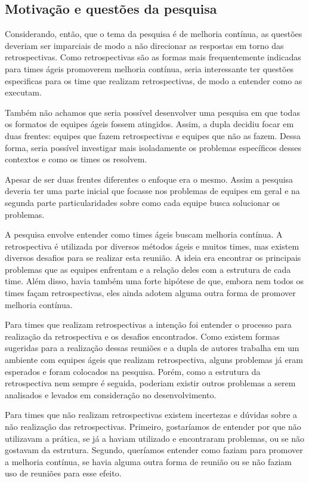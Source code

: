 \subsection{Motivação e questões da pesquisa}

Considerando, então, que o tema da pesquisa é de melhoria contínua, as questões deveriam ser imparciais de modo a não direcionar as respostas em torno das retrospectivas. Como retrospectivas são as formas mais frequentemente indicadas para times ágeis promoverem melhoria contínua, seria interessante ter questões especificas para os time que realizam retrospectivas, de modo a entender como as executam.

Também não achamos que seria possível desenvolver uma pesquisa em que todas os formatos de equipes ágeis fossem atingidos. Assim, a dupla decidiu focar em duas frentes: equipes que fazem retrospectivas e equipes que não as fazem. Dessa forma, seria possível investigar mais isoladamente os problemas específicos desses contextos e como os times os resolvem.

Apesar de ser duas frentes diferentes o enfoque era o mesmo. Assim a pesquisa deveria ter uma parte inicial que focasse nos problemas de equipes em geral e na segunda parte particularidades sobre como cada equipe busca solucionar os problemas.

A pesquisa envolve entender como times ágeis buscam melhoria contínua. A retrospectiva é utilizada por diversos métodos ágeis e muitos times, mas existem diversos desafios para se realizar esta reunião. A ideia era encontrar os principais problemas que as equipes enfrentam e a relação deles com a estrutura de cada time. Além disso, havia também uma forte hipótese de que, embora nem todos os times façam retrospectivas, eles ainda adotem alguma outra forma de promover melhoria contínua. 

Para times que realizam retrospectivas a intenção foi entender o processo para realização da retrospectiva e os desafios encontrados. Como existem formas sugeridas para a realização dessas reuniões e a dupla de autores trabalha em um ambiente com equipes ágeis que realizam retrospectiva, alguns problemas já eram esperados e foram colocados na pesquisa. Porém, como a estrutura da retrospectiva nem sempre é seguida, poderiam existir outros problemas a serem analisados e levados em consideração no desenvolvimento.

Para times que não realizam retrospectivas existem incertezas e dúvidas sobre a não realização das retrospectivas. Primeiro, gostaríamos de entender por que não utilizavam a prática, se já a haviam utilizado e encontraram problemas, ou se não gostavam da estrutura. Segundo, queríamos entender como faziam para promover a melhoria contínua, se havia alguma outra forma de reunião ou se não faziam uso de reuniões para esse efeito.

